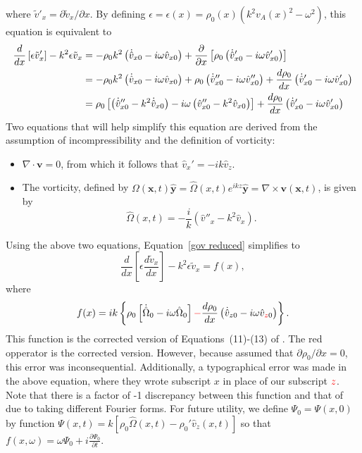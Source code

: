\documentclass[12pt]{../style-files/ociamthesis}
\begin{document}
where $\tilde{v}'_x = \partial\tilde{v}_x/\partial x$. By defining $\epsilon = \epsilon(x) = \rho_0(x)(k^2v_A(x)^2 - \omega^2)$, this equation is equivalent to
\begin{align}
\frac{d}{dx} \left[\epsilon \tilde{v}_x'\right] - k^2\epsilon \tilde{v}_x & = - \rho_0 k^2\left(\dot{\hat{v}}_{x0} - i\omega\hat{v}_{x0}\right) + \frac{\partial}{\partial x}\left[\rho_0\left(\dot{\hat{v}}_{x0}' - i\omega\hat{v}_{x0}'\right)\right] \notag \\
& = - \rho_0 k^2\left(\dot{\hat{v}}_{x0} - i\omega\hat{v}_{x0}\right) + \rho_0\left(\dot{\hat{v}}_{x0}'' - i\omega\hat{v}_{x0}''\right) + \frac{d\rho_0}{dx}\left(\dot{\hat{v}}_{x0}' - i\omega\hat{v}_{x0}'\right) \notag \\
& = \rho_0\left[\left(\dot{\hat{v}}_{x0}'' - k^2\dot{\hat{v}}_{x0}\right) - i\omega\left(\hat{v}_{x0}'' - k^2\hat{v}_{x0}\right)\right] + \frac{d\rho_0}{dx}\left(\dot{\hat{v}}_{x0}' - i\omega\hat{v}_{x0}'\right)
\label{gov reduced}
\end{align}
Two equations that will help simplify this equation are derived from the assumption of incompressibility and the definition of vorticity:
\begin{itemize}
	\item $\nabla\cdot\mathbf{v} = 0$, from which it follows that $\hat{v}_x' = -ik \hat{v}_z$.
	\item The vorticity, defined by $\Omega(\mathbf{x},t)\mathbf{\hat{y}} = \hat{\Omega}(x,t)e^{ikz}\mathbf{\hat{y}} = \nabla \times \mathbf{v}(\mathbf{x},t)$, is given by	\begin{equation}
	\hat{\Omega}(x,t) = -\frac{i}{k}\left(\hat{v}''_x - k^2 \hat{v}_x\right).
	\end{equation}
\end{itemize}
Using the above two equations, Equation~\eqref{gov reduced} simplifies to
\begin{equation}
\frac{d}{dx} \left[\epsilon \frac{d \tilde{v}_x}{d x}\right] - k^2\epsilon \tilde{v}_x = f(x), \label{gov}
\end{equation}
where
\begin{equation}f(x) = ik\left\{\rho_0\left[\dot{\hat{\Omega}}_0 - i\omega\hat{\Omega}_0\right] \textcolor{red}{-} \frac{d\rho_0}{dx}\left(\dot{\hat{v}}_{z0} - i\omega\hat{v}_{\textcolor{red}{z}0}\right)\right\}.
\end{equation}
This function is the corrected version of Equations~(11)-(13) of \cite{rae_etal81}. The red opperator is the corrected version. However, because \cite{rae_etal81} assumed that $\partial \rho_0 / \partial x = 0$, this error was inconsequential. Additionally, a typographical error was made in the above equation, where they wrote subscript $x$ in place of our subscript $\textcolor{red}{z}$. Note that there is a factor of -1 discrepancy between this function and that of \cite{rae_etal81} due to taking different Fourier forms. For future utility, we define $\Psi_0 = \Psi(x, 0)$ by function $\Psi(x, t) = k[\rho_0\hat{\Omega}(x, t) - \rho_0'\hat{v}_z(x, t)]$ so that $f(x, \omega) = \omega \Psi_0 + i\frac{\partial \Psi_0}{\partial t}$.
\end{document}
